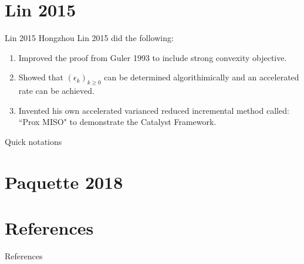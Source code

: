 \documentclass[11pt]{beamer}
\begin{document}
\section{Lin 2015}
    \begin{frame}{Lin 2015}
        Hongzhou Lin 2015 \cite{lin_universal_2015} did the following: 
        \begin{enumerate}
            \item Improved the proof from Guler 1993 to include strong convexity objective. 
            \item Showed that $(\epsilon_k)_{k\ge 0}$ can be determined algorithimically and  an accelerated rate can be achieved. 
            \item Invented his own accelerated varianced reduced incremental method called: ``Prox MISO" to demonstrate the Catalyst Framework. 
        \end{enumerate}
        \begin{block}{Quick notations}
            
        \end{block}
    \end{frame}
\section{Paquette 2018}
        
    
\section{References}
    \begin{frame}{References}
        \tiny
    \end{frame}
\end{document}
